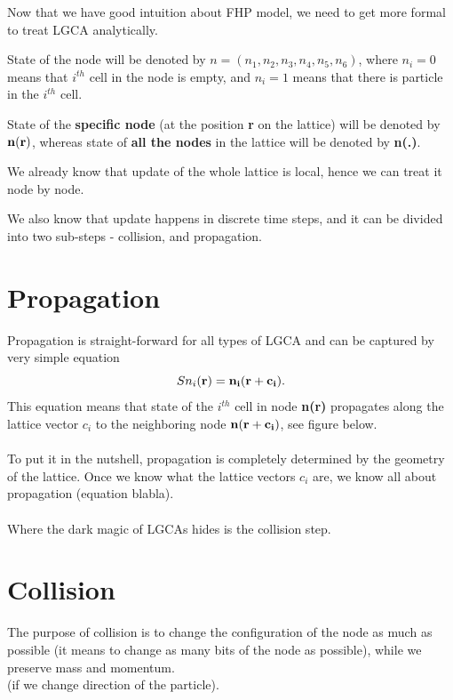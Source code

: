 Now that we have good intuition about FHP model, we need to get more formal to treat LGCA analytically.

State of the node will be denoted by $n = (n_1,n_2,n_3,n_4,n_5,n_6)$, where $n_i = 0$ means that $i^{th}$ cell in the node is empty, and $n_i = 1$ means that there is particle in the $i^{th}$ cell.

State of the \textbf{specific node} (at the position \textbf{r} on the lattice) will be denoted by $\bf{n(r)}$, whereas state of \textbf{all the nodes} in the lattice will be denoted by \textbf{n(.)}.

We already know that update of the whole lattice is local, hence we can treat it node by node.

We also know that update happens in discrete time steps, and it can be divided into two sub-steps - collision, and propagation.

\section{Propagation}
Propagation is straight-forward for all types of LGCA and can be captured by very simple equation
\begin{equation}
S n_i(\bf{r}) = n_i(\bf{r + c_i}). 
\end{equation}
This equation means that state of the $i^{th}$ cell in node \textbf{n(r)} propagates along the lattice vector $c_i$ to the neighboring node $\bf{n(r + c_i)}$, see figure below.\\
\\
To put it in the nutshell, propagation is completely determined by the geometry of the lattice. Once we know what the lattice vectors $c_i$ are, we know all about propagation (equation blabla).\\
\\
Where the dark magic of LGCAs hides is the collision step.\\

\section{Collision}
The purpose of collision is to change the configuration of the node as much as possible (it means to change as many bits of the node as possible), while we preserve mass and momentum.\\
(if we change direction of the particle). 

